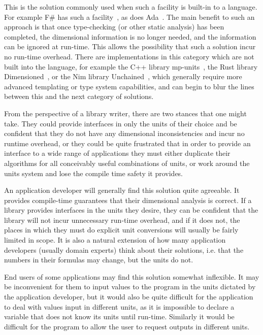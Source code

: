 \documentclass{article}
\begin{document}
This is the solution commonly used when such a facility is built-in to a language.
For example F\# has such a facility~\cite{FSharpUnitsofMeasure2020}, as does Ada~\cite{DimensionalityCheckingAda}.
The main benefit to such an approach is that once type-checking (or other static analysis) has been completed,
the dimensional information is no longer needed, and the information can be ignored at run-time.
This allows the possibility that such a solution incur no run-time overhead.
There are implementations in this category which are not built into the language,
for example the C++ library mp-units~\cite{mpunits}, the Rust library Dimensioned~\cite{RustDimensioned}, or the Nim library Unchained~\cite{SciNimUnchained},
which generally require more advanced templating or type system capabilities,
and can begin to blur the lines between this and the next category of solutions.

From the perspective of a library writer, there are two stances that one might take.
They could provide interfaces in only the units of their choice and be confident that they do not have any dimensional inconsistencies and incur no runtime overhead,
or they could be quite frustrated that in order to provide an interface to a wide range of applications they must either duplicate their algorithms for all conceivably useful combinations of units, or work around the units system and lose the compile time safety it provides.

An application developer will generally find this solution quite agreeable.
It provides compile-time guarantees that their dimensional analysis is correct.
If a library provides interfaces in the units they desire, they can be confident that the library will not incur unnecessary run-time overhead,
and if it does not, the places in which they must do explicit unit conversions will usually be fairly limited in scope.
It is also a natural extension of how many application developers (usually domain experts) think about their solutions,
i.e. that the numbers in their formulas may change, but the units do not.

End users of some applications may find this solution somewhat inflexible.
It may be inconvenient for them to input values to the program in the units dictated by the application developer,
but it would also be quite difficult for the application to deal with values input in different units,
as it is impossible to declare a variable that does not know its units until run-time.
Similarly it would be difficult for the program to allow the user to request outputs in different units.
\end{document}
